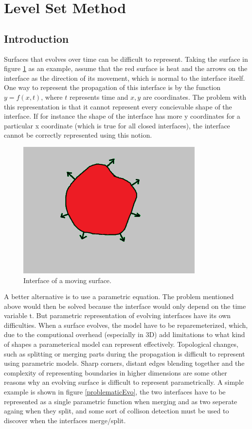 \section{Level Set Method}
\label{levelSetChap}
\subsection{Introduction}
Surfaces that evolves over time can be difficult to represent. Taking the surface in figure \ref{interface} as an example, assume that the red surface is heat and the arrows on the interface as the direction of its movement, which is normal to the interface itself. One way to represent the propagation of this interface is by the function $y = f(x,t)$, where $t$ represents time and $x,y$ are coordinates. The problem with this representation is that it cannot represent every concievable shape of the interface. If for instance the shape
of the interface has more y coordinates for a particular x coordinate (which is true for all closed interfaces), the interface cannot be correctly represented using this notion.
\begin{figure}[h!]
\centering
\includegraphics[width=.5\textwidth]{backgroundTheory/levelset/interface}
\caption{Interface of a moving surface.}
\label{interface}
\end{figure}
A better alternative is to use a parametric equation. The problem mentioned above would then be solved because the interface would only depend on the time variable t. But parametric representation of evolving interfaces have its own difficulties. When a surface evolves, the model have to be reparemeterized, which, due to the computional overhead (especially in 3D) add limitations to what kind of shapes a parameterical model can represent effectively. Topological changes, such as splitting or merging parts during the propagation is difficult to represent using parametric models. Sharp corners, distant edges blending together and the complexity of representing boundaries in higher dimensions are some other reasons why an evolving surface is difficult to represent parametrically. A simple example is shown in figure \ref{problematicEvo}, the two interfaces have to be represented as a single parametric function when merging and as two seperate againg when they split, and some sort of collison detection must be used to discover when the interfaces merge/split.
